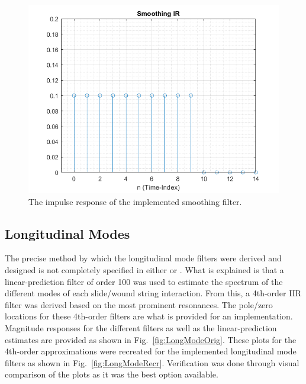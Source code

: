 \documentclass[../main.tex]{subfiles}
\begin{document}
\begin{figure}[!h]
    \centering
    \includegraphics[scale=.53]{./images/plots/SmoothingIR.png}
    \caption{The impulse response of the implemented smoothing filter.}
    \label{fig:SmoothingIR}
\end{figure}

\clearpage

\subsection{Longitudinal Modes}
The precise method by which the longitudinal mode filters were derived and designed is not completely specified in either  or . What is explained is that a linear-prediction filter of order 100 was used to estimate the spectrum of the different modes of each slide/wound string interaction. From this, a 4th-order IIR filter was derived based on the most prominent resonances. The pole/zero locations for these 4th-order filters are what is provided for an implementation. Magnitude responses for the different filters as well as the linear-prediction estimates are provided as shown in Fig.~\ref{fig:LongModeOrig}. These plots for the 4th-order approximations were recreated for the implemented longitudinal mode filters as shown in Fig.~\ref{fig:LongModeRecr}. Verification was done through visual comparison of the plots as it was the best option available.
\end{document}
